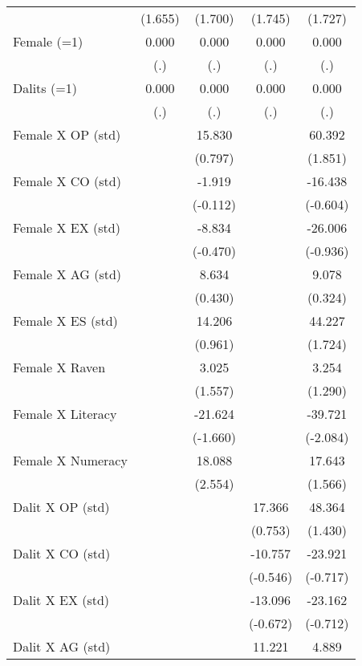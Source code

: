 \begin{table}[htbp]
{\begin{tabular}{lcccc}
          & (1.655) & (1.700) & (1.745) & (1.727) \\
    Female (=1) & 0.000 & 0.000 & 0.000 & 0.000 \\
          & (.)   & (.)   & (.)   & (.) \\
    Dalits (=1) & 0.000 & 0.000 & 0.000 & 0.000 \\
          & (.)   & (.)   & (.)   & (.) \\
    Female X OP (std) &       & 15.830 &       & 60.392 \\
          &       & (0.797) &       & (1.851) \\
    Female X CO (std) &       & -1.919 &       & -16.438 \\
          &       & (-0.112) &       & (-0.604) \\
    Female X EX (std) &       & -8.834 &       & -26.006 \\
          &       & (-0.470) &       & (-0.936) \\
    Female X AG (std) &       & 8.634 &       & 9.078 \\
          &       & (0.430) &       & (0.324) \\
    Female X ES (std) &       & 14.206 &       & 44.227 \\
          &       & (0.961) &       & (1.724) \\
    Female X Raven &       & 3.025 &       & 3.254 \\
          &       & (1.557) &       & (1.290) \\
    Female X Literacy &       & -21.624 &       & -39.721 \\
          &       & (-1.660) &       & (-2.084) \\
    Female X Numeracy &       & 18.088 &       & 17.643 \\
          &       & (2.554) &       & (1.566) \\
    Dalit X OP (std) &       &       & 17.366 & 48.364 \\
          &       &       & (0.753) & (1.430) \\
    Dalit X CO (std) &       &       & -10.757 & -23.921 \\
          &       &       & (-0.546) & (-0.717) \\
    Dalit X EX (std) &       &       & -13.096 & -23.162 \\
          &       &       & (-0.672) & (-0.712) \\
    Dalit X AG (std) &       &       & 11.221 & 4.889 \\

\end{tabular}}
\end{table}
